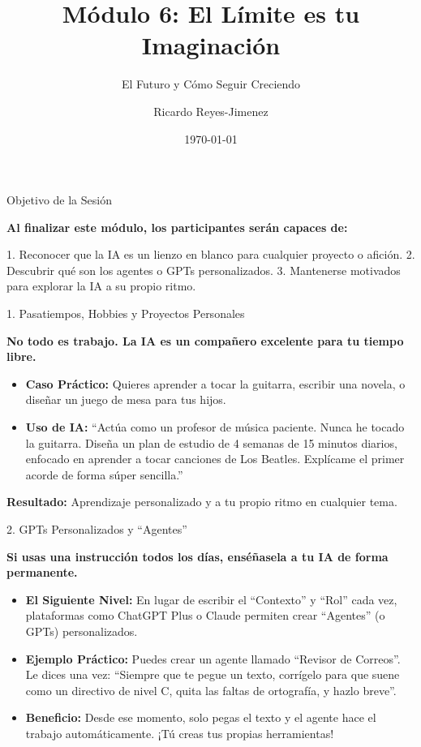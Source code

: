 \documentclass[aspectratio=169]{beamer}
\title[Módulo 6: El Límite es tu Imag]{Módulo 6: El Límite es tu Imaginación}
\subtitle{El Futuro y Cómo Seguir Creciendo}
\author{Ricardo Reyes-Jimenez}
\institute{IA para Todos}
\date{\today}
\begin{document}
\begin{frame}
  \titlepage
\end{frame}

\usebackgroundtemplate{}



\begin{frame}[fragile]{Objetivo de la Sesión}


\textbf{Al finalizar este módulo, los participantes serán capaces de:}

1. Reconocer que la IA es un lienzo en blanco para cualquier proyecto o afición.
2. Descubrir qué son los agentes o GPTs personalizados.
3. Mantenerse motivados para explorar la IA a su propio ritmo.

\end{frame}



\begin{frame}[fragile]{1. Pasatiempos, Hobbies y Proyectos Personales}


\textbf{No todo es trabajo. La IA es un compañero excelente para tu tiempo libre.}

\begin{itemize}
  \item \textbf{Caso Práctico:} Quieres aprender a tocar la guitarra, escribir una novela, o diseñar un juego de mesa para tus hijos.
  \item \textbf{Uso de IA:} ``Actúa como un profesor de música paciente. Nunca he tocado la guitarra. Diseña un plan de estudio de 4 semanas de 15 minutos diarios, enfocado en aprender a tocar canciones de Los Beatles. Explícame el primer acorde de forma súper sencilla.''
\end{itemize}
\textbf{Resultado:} Aprendizaje personalizado y a tu propio ritmo en cualquier tema.

\end{frame}



\begin{frame}[fragile]{2. GPTs Personalizados y ``Agentes''}


\textbf{Si usas una instrucción todos los días, enséñasela a tu IA de forma permanente.}

\begin{itemize}
  \item \textbf{El Siguiente Nivel:} En lugar de escribir el ``Contexto'' y ``Rol'' cada vez, plataformas como ChatGPT Plus o Claude permiten crear ``Agentes'' (o GPTs) personalizados.
  \item \textbf{Ejemplo Práctico:} Puedes crear un agente llamado ``Revisor de Correos''. Le dices una vez: ``Siempre que te pegue un texto, corrígelo para que suene como un directivo de nivel C, quita las faltas de ortografía, y hazlo breve''.
  \item \textbf{Beneficio:} Desde ese momento, solo pegas el texto y el agente hace el trabajo automáticamente. ¡Tú creas tus propias herramientas!
\end{itemize}
\end{frame}
\end{document}
